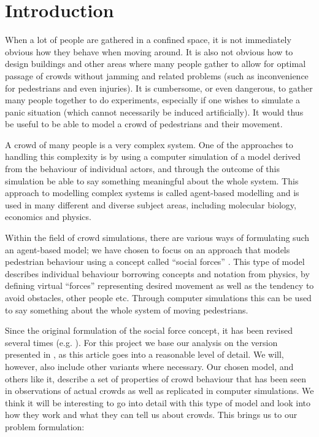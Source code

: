 \section{Introduction}
When a lot of people are gathered in a confined space, it is not immediately 
obvious how they behave when moving around. It is also not obvious how to 
design buildings and other areas where many people gather to allow for optimal 
passage of crowds without jamming and related problems (such as inconvenience 
for pedestrians and even injuries). It is cumbersome, or even dangerous, to 
gather many people together to do experiments, especially if one wishes to 
simulate a panic situation (which cannot necessarily be induced artificially).  
It would thus be useful to be able to model a crowd of pedestrians and their 
movement.

A crowd of many people is a very complex system. One of the approaches to 
handling this complexity is by using a computer simulation of a model derived 
from the behaviour of individual actors, and through the outcome of this 
simulation be able to say something meaningful about the whole system. This 
approach to modelling complex systems is called agent-based modelling and is 
used in many different and diverse subject areas, including molecular biology, 
economics and physics.

Within the field of crowd simulations, there  are various ways of formulating 
such an agent-based model; we have chosen to focus on an approach that models 
pedestrian behaviour using a concept called ``social forces'' 
\cite{social-force}. This type of model describes individual behaviour 
borrowing concepts and notation from physics, by defining  virtual ``forces'' 
representing desired movement as well as the tendency to avoid obstacles, 
other people etc. Through computer simulations this can be used to say 
something about the whole system of moving pedestrians.

Since the original formulation of the social force concept, it has been 
revised several times (e.g.  \cite{helbing00}). For this project we base our 
analysis on the  version presented in \cite{self-org}, as this article goes 
into a reasonable level of detail. We will, however, also include other 
variants where necessary.  Our chosen model, and others like it, describe a 
set of properties of crowd behaviour that has been seen in observations of 
actual crowds as well as replicated in computer simulations.  We think it will 
be interesting to go into detail with this type of model and look into how 
they work and what they can tell us about crowds. This brings us to our 
problem formulation:

